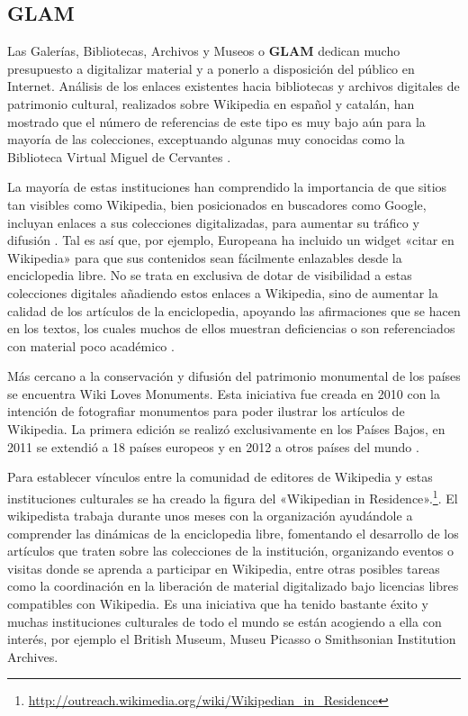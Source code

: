 \documentclass[11pt,onecolumn]{article}
\begin{document}
\subsection{GLAM}


Las Galerías, Bibliotecas, Archivos y Museos o \textbf{GLAM} dedican mucho presupuesto a digitalizar material y a ponerlo a disposición del público en Internet. Análisis de los enlaces existentes hacia bibliotecas y archivos digitales de patrimonio cultural, realizados sobre Wikipedia en español y catalán, han mostrado que el número de referencias de este tipo es muy bajo aún para la mayoría de las colecciones, exceptuando algunas muy conocidas como la Biblioteca Virtual Miguel de Cervantes \citep{saorin2012}.

La mayoría de estas instituciones han comprendido la importancia de que sitios tan visibles como Wikipedia, bien posicionados en buscadores como Google, incluyan enlaces a sus colecciones digitalizadas, para aumentar su tráfico y difusión \citep{lally2007, elder2012}. Tal es así que, por ejemplo, Europeana ha incluido un widget «citar en Wikipedia» para que sus contenidos sean fácilmente enlazables desde la enciclopedia libre. No se trata en exclusiva de dotar de visibilidad a estas colecciones digitales añadiendo estos enlaces a Wikipedia, sino de aumentar la calidad de los artículos de la enciclopedia, apoyando las afirmaciones que se hacen en los textos, los cuales muchos de ellos muestran deficiencias o son referenciados con material poco académico \citep{nielsen2007, luyt2010}.


Más cercano a la conservación y difusión del patrimonio monumental de los países se encuentra Wiki Loves Monuments. Esta iniciativa fue creada en 2010 con la intención de fotografiar monumentos para poder ilustrar los artículos de Wikipedia. La primera edición se realizó exclusivamente en los Países Bajos, en 2011 se extendió a 18 países europeos y en 2012 a otros países del mundo \citep{rodriguez2012wlm}.



Para establecer vínculos entre la comunidad de editores de Wikipedia y estas instituciones culturales se ha creado la figura del «Wikipedian in Residence».\footnote{\href{http://outreach.wikimedia.org/wiki/Wikipedian_in_Residence}{http://outreach.wikimedia.org/wiki/Wikipedian\_in\_Residence}}. El wikipedista trabaja durante unos meses con la organización ayudándole a comprender las dinámicas de la enciclopedia libre, fomentando el desarrollo de los artículos que traten sobre las colecciones de la institución, organizando eventos o visitas donde se aprenda a participar en Wikipedia, entre otras posibles tareas como la coordinación en la liberación de material digitalizado bajo licencias libres compatibles con Wikipedia. Es una iniciativa que ha tenido bastante éxito y muchas instituciones culturales de todo el mundo se están acogiendo a ella con interés, por ejemplo el British Museum, Museu Picasso o Smithsonian Institution Archives.
\end{document}
